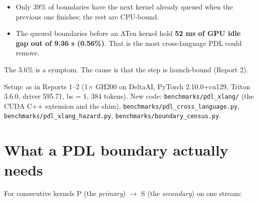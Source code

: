 \documentclass[10pt]{article}
\begin{document}
\begin{itemize}
\item Only 39\% of boundaries have the next kernel already queued when the previous one finishes; the rest are CPU-bound.
\item The queued boundaries before an ATen kernel hold \textbf{52 ms of GPU idle gap out of 9.36 s (0.56\%)}. That is the most cross-language PDL could remove.
\end{itemize}

The 3.6\% is a symptom. The cause is that the step is launch-bound (Report 2).


Setup: as in Reports 1--2 (1$\times$ GH200 on DeltaAI, PyTorch 2.10.0+cu129, Triton 3.6.0, driver 595.71, bs = 1, 384 tokens). New code: \texttt{benchmarks/pdl\_xlang/} (the CUDA C++ extension and the shim), \texttt{benchmarks/pdl\_cross\_language.py}, \texttt{benchmarks/pdl\_xlang\_hazard.py}, \texttt{benchmarks/boundary\_census.py}.



\section{What a PDL boundary actually needs}

For consecutive kernels P (the \emph{primary}) $\rightarrow$ S (the \emph{secondary}) on one stream:


\begin{table}[H]\centering\small
{}
\end{table}
\end{document}
